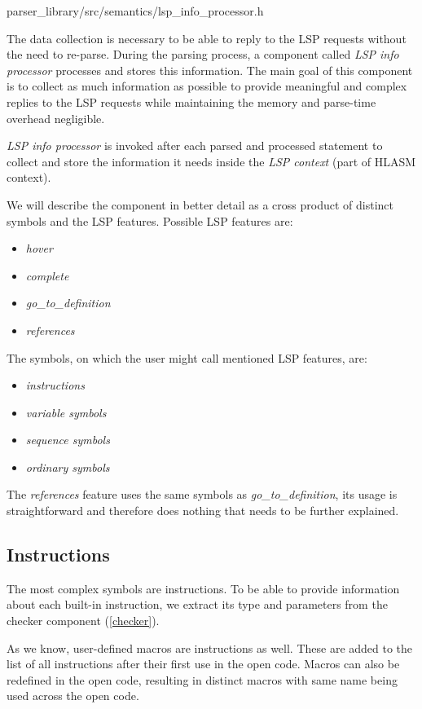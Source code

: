 {parser\_library/src/semantics/lsp\_info\_processor.h}
\label{lsp_data}

The data collection is necessary to be able to reply to the LSP requests without the need to re-parse. During the parsing process, a component called \emph{LSP info processor} processes and stores this information. The main goal of this component is to collect as much information as possible to provide meaningful and complex replies to the LSP requests while maintaining the memory and parse-time overhead negligible.

\emph{LSP info processor} is invoked after each parsed and processed statement to collect and store the information it needs inside the \emph{LSP context} (part of HLASM context). 

We will describe the component in better detail as a cross product of distinct symbols and the LSP features. Possible LSP features are:
\begin{itemize}
	\item \emph{hover}
	\item \emph{complete}
	\item \emph{go\_to\_definition}
	\item \emph{references}
\end{itemize}
The symbols, on which the user might call mentioned LSP features, are:
\begin{itemize}
	\item \emph{instructions}
	\item \emph{variable symbols}
	\item \emph{sequence symbols}
	\item \emph{ordinary symbols}
\end{itemize}

The \emph{references} feature uses the same symbols as \emph{go\_to\_definition}, its usage is straightforward and therefore does nothing that needs to be further explained.

\subsection{Instructions}

The most complex symbols are instructions. To be able to provide information about each built-in instruction, we extract its type and parameters from the checker component (\cref{checker}).

As we know, user-defined macros are instructions as well. These are added to the list of all instructions after their first use in the open code. Macros can also be redefined in the open code, resulting in distinct macros with same name being used across the open code.

